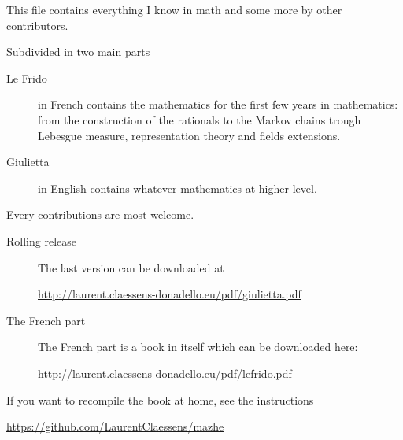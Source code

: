 
\thispagestyle{empty}

This file contains everything I know in math and some more by other contributors.

Subdivided in two main parts
\begin{description}
	\item[Le Frido] in French contains the mathematics for the first few years in mathematics: from the construction of the rationals to the Markov chains trough Lebesgue measure, representation theory and fields extensions.
	\item[Giulietta] in English contains whatever mathematics at higher level.
\end{description}

\begin{center}
	Every contributions are most welcome.
\end{center}

\vfill

\begin{description}
	\item[Rolling release]

	      The last version can be downloaded at
	      \begin{center}
		      \url{http://laurent.claessens-donadello.eu/pdf/giulietta.pdf}
	      \end{center}

	\item[The French part]
	      The French part is a book in itself which can be downloaded here:
	      \begin{center}
		      \url{http://laurent.claessens-donadello.eu/pdf/lefrido.pdf}
	      \end{center}

\end{description}

If you want to recompile the book at home, see the instructions
\begin{center}
	\url{https://github.com/LaurentClaessens/mazhe}
\end{center}
